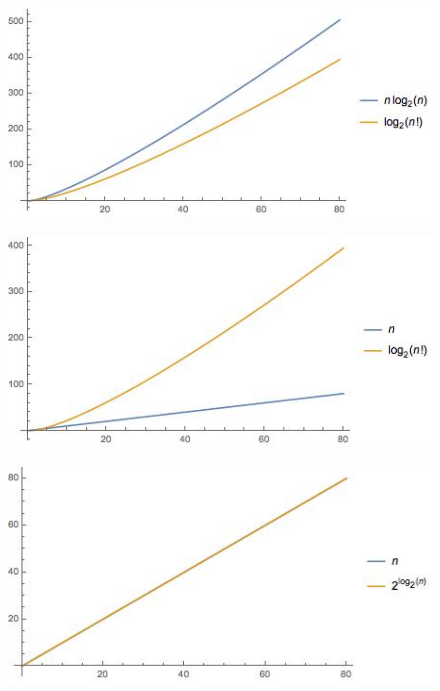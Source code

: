 \documentclass[11 pt, a4paper]{article}
\theoremstyle{definition}
\begin{document}
\begin{enumerate}
\begin{figure}[H]
      \end{figure} \begin{figure}[H]
         \centering
          \includegraphics[trim=0cm 0cm 0cm 0cm, width=12cm]{14.jpg} 
      \end{figure} \begin{figure}[H]
         \centering
          \includegraphics[trim=0cm 0cm 0cm 0cm, width=12cm]{15.jpg} 
      \end{figure} \begin{figure}[H]
         \centering
          \includegraphics[trim=0cm 0cm 0cm 0cm, width=12cm]{16.jpg} 
      \end{figure} \begin{figure}[H]

\end{figure}
\end{enumerate}
\end{document}

